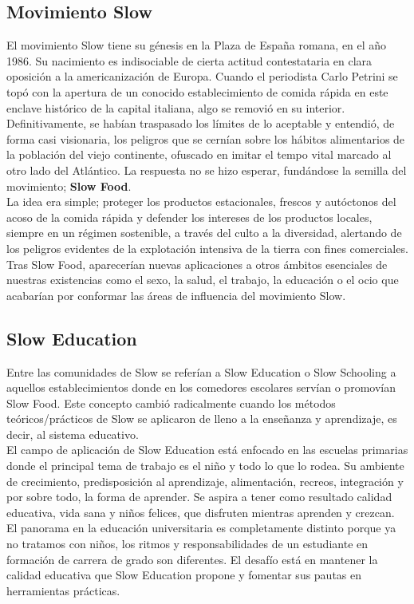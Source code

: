 \subsection{Movimiento Slow}
El movimiento Slow tiene su g\'enesis en la Plaza de Espa\~na romana, en el año 1986. Su nacimiento es indisociable de cierta actitud contestataria en clara 
oposici\'on a la americanizaci\'on de Europa. Cuando el periodista Carlo Petrini se top\'o con la apertura de un conocido establecimiento de comida r\'apida en 
este enclave hist\'orico de la capital italiana, algo se removi\'o en su interior. Definitivamente, se hab\'ian traspasado los l\'imites de lo aceptable y 
entendi\'o, de forma casi visionaria, los peligros que se cern\'ian sobre los h\'abitos alimentarios de la poblaci\'on del viejo continente, ofuscado en imitar 
el tempo vital marcado al otro lado del Atl\'antico. La respuesta no se hizo esperar, fund\'andose la semilla del movimiento; \textbf{Slow Food}.\\
La idea era simple; proteger los productos estacionales, frescos y aut\'octonos del acoso de la comida r\'apida y defender los intereses de los productos locales,
siempre en un r\'egimen sostenible, a trav\'es del culto a la diversidad, alertando de los peligros evidentes de la explotaci\'on intensiva de la tierra con 
fines comerciales.\\
Tras Slow Food, aparecer\'ian nuevas aplicaciones a otros \'ambitos esenciales de nuestras existencias como el sexo, la salud, el trabajo, la educación o el ocio
que acabar\'ian por conformar las \'areas de influencia del movimiento Slow. 


\subsection{Slow Education}
Entre las comunidades de Slow se refer\'ian a Slow Education o Slow Schooling a aquellos establecimientos donde en los comedores escolares serv\'ian o 
promov\'ian Slow Food. Este concepto cambi\'o radicalmente cuando los m\'etodos te\'oricos/pr\'acticos de Slow se aplicaron de lleno a la ense\~nanza y 
aprendizaje, es decir, al sistema educativo.\\
El campo de aplicaci\'on de Slow Education est\'a enfocado en las escuelas primarias donde el principal tema de trabajo es el ni\~no y todo lo que lo rodea. Su 
ambiente de crecimiento, predisposici\'on al aprendizaje,  alimentaci\'on, recreos, integraci\'on y por sobre todo, la forma de aprender. Se aspira 
a tener como resultado calidad educativa, vida sana y ni\~nos felices, que disfruten mientras aprenden y crezcan.\\
El panorama en la educaci\'on universitaria es completamente distinto porque ya no tratamos con ni\~nos, los ritmos y responsabilidades de un estudiante en 
formaci\'on de carrera de grado son diferentes. El desaf\'io est\'a en mantener la calidad educativa que Slow Education propone y fomentar sus pautas en herramientas
pr\'acticas.

